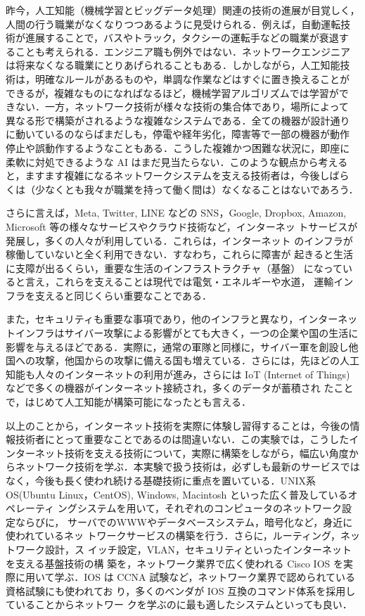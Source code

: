 %

昨今，人工知能（機械学習とビッグデータ処理）関連の技術の進展が目覚しく，
人間の行う職業がなくなりつつあるように見受けられる．例えば，自動運転技
術が進展することで，バスやトラック，タクシーの運転手などの職業が衰退す
ることも考えられる．エンジニア職も例外ではない．ネットワークエンジニア
は将来なくなる職業にとりあげられることもある．しかしながら，人工知能技
術は，明確なルールがあるものや，単調な作業などはすぐに置き換えることが
できるが，複雑なものになればなるほど，機械学習アルゴリズムでは学習がで
きない．一方，ネットワーク技術が様々な技術の集合体であり，場所によって
異なる形で構築がされるような複雑なシステムである．全ての機器が設計通り
に動いているのならばまだしも，停電や経年劣化，障害等で一部の機器が動作
停止や誤動作するようなこともある．こうした複雑かつ困難な状況に，即座に
柔軟に対処できるような AI はまだ見当たらない．このような観点から考える
と，ますます複雑になるネットワークシステムを支える技術者は，今後しばら
くは（少なくとも我々が職業を持って働く間は）なくなることはないであろう．

さらに言えば，Meta, Twitter, LINE などの SNS，Google, Dropbox,
Amazon, Microsoft 等の様々なサービスやクラウド技術など，インターネッ
トサービスが発展し，多くの人々が利用している．これらは，インターネット
のインフラが稼働していないと全く利用できない．すなわち，これらに障害が
起きると生活に支障が出るくらい，重要な生活のインフラストラクチャ（基盤）
になっていると言え，これらを支えることは現代では電気・エネルギーや水道，
運輸インフラを支えると同じくらい重要なことである．

また，セキュリティも重要な事項であり，他のインフラと異なり，インターネッ
トインフラはサイバー攻撃による影響がとても大きく，一つの企業や国の生活に
影響を与えるほどである．実際に，通常の軍隊と同様に，サイバー軍を創設し他
国への攻撃，他国からの攻撃に備える国も増えている．さらには，先ほどの人工
知能も人々のインターネットの利用が進み，さらには IoT (Internet of
Things) などで多くの機器がインターネット接続され，多くのデータが蓄積され
たことで，はじめて人工知能が構築可能になったとも言える．

以上のことから，インターネット技術を実際に体験し習得することは，今後の情
報技術者にとって重要なことであるのは間違いない．この実験では，こうしたイ
ンターネット技術を支える技術について，実際に構築をしながら，幅広い角度か
らネットワーク技術を学ぶ．本実験で扱う技術は，必ずしも最新のサービスでは
なく，今後も長く使われ続ける基礎技術に重点を置いている．UNIX系OS(Ubuntu
Linux，CentOS), Windows, Macintosh といった広く普及しているオペレーティ
ングシステムを用いて，それぞれのコンピュータのネットワーク設定ならびに，
サーバでのWWWやデータベースシステム，暗号化など，身近に使われているネッ
トワークサービスの構築を行う．さらに，ルーティング，ネットワーク設計，ス
イッチ設定，VLAN，セキュリティといったインターネットを支える基盤技術の構
築を，ネットワーク業界で広く使われる Cisco IOS を実際に用いて学ぶ．IOS 
は CCNA 試験など，ネットワーク業界で認められている資格試験にも使われてお
り，多くのベンダが IOS 互換のコマンド体系を採用していることからネットワー
クを学ぶのに最も適したシステムといっても良い．

